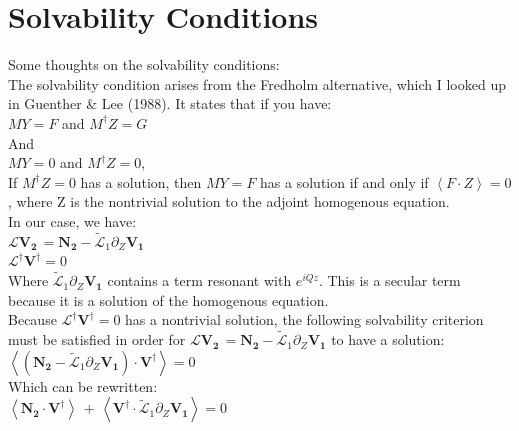 \documentclass[letterpaper,12pt]{article}
\begin{document}
\section*{Solvability Conditions}

Some thoughts on the solvability conditions: \\

The solvability condition arises from the Fredholm alternative, which I looked up in Guenther \& Lee (1988). It states that if you have: \\

$M Y = F$ and $M^\dagger Z = G$ \\

And \\

$M Y = 0$ and $M^\dagger Z = 0$, \\

If $M^\dagger Z = 0$ has a solution, then $M Y = F$ has a solution if and only if $\left<F \cdot Z \right> = 0$, where Z is the nontrivial solution to the adjoint homogenous equation. \\

In our case, we have: \\

$\mathcal{L}\mathbf{V_2} \, = \mathbf{N_2} - \widetilde{\mathcal{L}}_1 \partial_Z \mathbf{V_1}$ \\

$\mathcal{L}^\dagger \mathbf{V}^\dagger = 0$ \\ 

Where $\widetilde{\mathcal{L}}_1 \partial_Z \mathbf{V_1}$ contains a term resonant with $e^{iQz}$. This is a secular term because it is a solution of the homogenous equation. \\

Because $\mathcal{L}^\dagger \mathbf{V}^\dagger = 0$ has a nontrivial solution, the following solvability criterion must be satisfied in order for $\mathcal{L}\mathbf{V_2} \, = \mathbf{N_2} - \widetilde{\mathcal{L}}_1 \partial_Z \mathbf{V_1}$ to have a solution: \\

$\left<\left(\mathbf{N_2} - \widetilde{\mathcal{L}}_1 \partial_Z \mathbf{V_1}\right) \cdot \mathbf{V}^\dagger\right> = 0$ \\

Which can be rewritten: \\

$\left<\mathbf{N_2} \cdot \mathbf{V}^\dagger \right> \, + \, \left< \mathbf{V}^\dagger \cdot \widetilde{\mathcal{L}}_1 \partial_Z \mathbf{V_1}\right> = 0 $ \\
\end{document}

